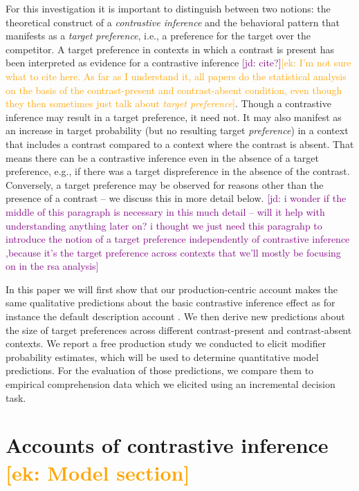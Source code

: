 \documentclass[10pt,letterpaper]{article}
\newcommand{\ek}[1]{\textcolor{Orange}{[ek: #1]}}
\newcommand{\jd}[1]{\textcolor{Purple}{[jd: #1]}}
\begin{document}
For this investigation it is important to distinguish between two notions: the theoretical construct of a \emph{contrastive inference} and the behavioral pattern that manifests as a \emph{target preference}, i.e., a preference for the target over the competitor. A target preference in contexts in which a contrast is present has been interpreted as evidence for a contrastive inference \jd{cite?}\ek{I'm not sure what to cite here. As far as I understand it, all papers do the statistical analysis on the basis of the contrast-present and contrast-absent condition, even though they then sometimes just talk about \textit{target preference}}. Though a contrastive inference may result in a target preference, it need not. It may also manifest as an increase in target probability (but no resulting target \emph{preference}) in a context that includes a contrast compared to a context where the contrast is absent. That means there can be a contrastive inference even in the absence of a target preference, e.g., if there was a target dispreference in the absence of the contrast. Conversely, a target preference may be observed for reasons other than the presence of a contrast -- we discuss this in more detail below. \jd{i wonder if the middle of this paragraph is necessary in this much detail -- will it help with understanding anything later on? i thought we just need this paragrahp to introduce the notion of a target preference independently of contrastive inference ,because it's the target preference across contexts that we'll mostly be focusing on in the rsa analysis}

In this paper we will first show that our production-centric account makes the same qualitative predictions about the basic contrastive inference effect as for instance the default description account \cite{Sedivy:2003}. We then derive new predictions about the size of target preferences across different contrast-present and contrast-absent contexts. We report a free production study we conducted to elicit modifier probability estimates, which will be used to determine quantitative model predictions. For the evaluation of those predictions, we compare them to empirical comprehension data which we elicited using an incremental decision task.


\section{Accounts of contrastive inference \ek{Model section}}
\end{document}
